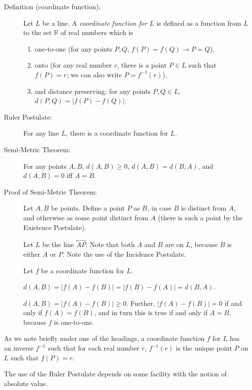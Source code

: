 \documentclass[12pt]{article}
\newcommand\Line[1]{\overset{\leftrightarrow}{#1}}
\begin{document}
\begin{description}


\item[Definition (coordinate function):]  Let $L$ be a line.  A {\em coordinate function for $L$\/} is defined as a function from $L$ to the set $\mathbb R$ of real numbers which is 

\begin{enumerate}\item one-to-one (for any points $P, Q$, $f(P) =f(Q) \rightarrow P=Q$), \item onto (for any real number $r$, there is a point $P\in L$ such that $f(P) = r$;  we can also write $P=f^{-1}(r)$), \item and distance preserving:  for any points $P,Q \in L$, $d(P,Q) = |f(P)-f(Q)|$.\end{enumerate}
\item[Ruler Postulate:]  For any line $L$, there is a coordinate function for $L$.

\item[Semi-Metric Theorem:]  For any points $A,B$, $d(A,B)\geq 0$, $d(A,B) = d(B,A)$, and $d(A,B)=0$ iff $A=B$.

\item[Proof of Semi-Metric Theorem:]

Let $A,B$ be points.   Define a point $P$ as $B$, in case $B$ is distinct from $A$, and otherwise as some point distinct from $A$ (there is such a point by the Existence Postulate).

Let $L$ be the line $\Line{AP}$.  Note that both $A$ and $B$ are on $L$, because $B$ is either $A$ or $P$.  Note the use of the Incidence Postulate.

Let $f$ be a coordinate function for $L$.

$d(A,B) = |f(A)-f(B)| = |f(B)-f(A)| = d(B,A)$.

$d(A,B)= |f(A)-f(B)| \geq 0$.  Further, $|f(A)-f(B)|=0$ if and only if $f(A)=f(B)$, and in turn this is true if and only if $A=B$, because $f$ is one-to-one.

\end{description}

As we note briefly under one of the headings, a coordinate function $f$ for $L$ has an inverse $f^{-1}$ such that for each real number $r$, $f^{-1}(r)$ is the unique point $P$ on $L$ such that $f(P)=r$.



The use of the Ruler Postulate depends on some facility with the notion of absolute value.
\end{document}
